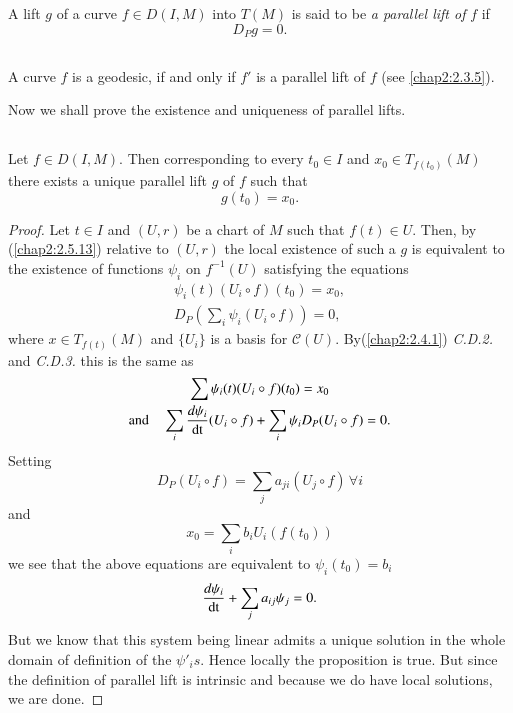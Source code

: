 \subsection{}\label{chap2:2.7.2}

\begin{defi*}
A lift $g$ of a curve $f\in D(I,M)$ into $T(M)$ is said to be {\em a
  parallel lift of} $f$ if
$$
D_{P}g=0.
$$
\end{defi*}

\subsection{}\label{chap2:2.7.3}

\begin{example*}
A curve $f$ is a geodesic, if and only if $f'$ is a parallel lift of
$f$ (see \ref{chap2:2.3.5}).
\end{example*}

Now we shall prove the existence and uniqueness of parallel lifts.

\subsection{}\label{chap2:2.7.4}

\begin{prop*}
Let $f\in D(I,M)$. Then corresponding to every $t_{0}\in I$ and
$x_{0}\in T_{f(t_{0})}(M)$ there exists a unique parallel lift $g$ of
$f$ such that
$$
g(t_{0})=x_{0}.
$$
\end{prop*}

\begin{proof}
Let $t\in I$ and $(U,r)$ be a chart of $M$ such that $f(t)\in
U$. Then, by (\ref{chap2:2.5.13}) relative to $(U,r)$ the local existence
of such a $g$ is equivalent to the existence of functions $\psi_{i}$
on $f^{-1}(U)$ satisfying the equations
\begin{gather*}
\psi_{i}(t)(U_{i}\circ f)(t_{0})=x_{0},\\
D_{P}(\sum_{i}\psi_{i}(U_{i}\circ f))=0,
\end{gather*}
where $x\in T_{f(t)}(M)$ and $\{U_{i}\}$ is a basis for $\mathscr{C}(U)$.
By\pageoriginale (\ref{chap2:2.4.1}) {\em C.D.2.} and {\em C.D.3.} this is
the same as 
\begin{gather*}
\sum \psi_{i}(t)(U_{i}\circ f)(t_{0})=x_{0}\\
\text{and}\quad \sum_{i}\dfrac{d\psi_{i}}{\operatorname{dt}}(U_{i}\circ
f)+\sum_{i}\psi_{i}D_{P}(U_{i}\circ f)=0.
\end{gather*}
Setting
$$
D_{P}(U_{i}\circ f)=\sum_{j}a_{ji}(U_{j}\circ f) \, \forall i
$$
and 
$$
x_{0}=\sum_{i}b_{i}U_{i}(f(t_{0}))
$$
we see that the above equations are equivalent to
$\psi_{i}(t_{0})=b_{i}$
$$
\dfrac{d\psi_{i}}{\operatorname{dt}}+\sum_{j}a_{ij}\psi_{j}=0.
$$
But we know that this system being linear admits a unique solution in
the whole domain of definition of the $\psi'_{i}s$. Hence locally the
proposition is true. But since the definition of parallel lift is
intrinsic and because we do have local solutions, we are done.
\end{proof}


